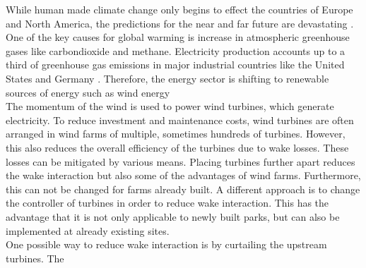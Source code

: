 While human made climate change only begins to effect the countries of Europe and North America, the predictions for the near and far future are devastating \cite{hoegh-guldberg_impacts_2019}. One of the key causes for global warming is increase in atmospheric greenhouse gases like carbondioxide and methane. Electricity production accounts  up to a third of greenhouse gas emissions in major industrial countries like the United States \cite{hockstad_inventory_2018} and Germany \cite{ortl_entwicklung_2020}. Therefore, the energy sector is shifting to renewable sources of energy such as wind energy \cite{international_energy_agency_global_2020}\\
The momentum of the wind is used to power wind turbines, which generate electricity. To reduce investment and maintenance costs, wind turbines are often arranged in wind farms of multiple, sometimes hundreds of turbines. However, this also reduces the overall efficiency of the turbines due to wake losses. These losses can be mitigated by various means. Placing turbines further apart reduces the wake interaction but also some of the advantages of wind farms. Furthermore, this can not be changed for farms already built. A different approach is to change the controller of turbines in order to reduce wake interaction. This has the advantage that it is not only applicable to newly built parks, but can also be implemented at already existing sites. \\
One possible way to reduce wake interaction is by curtailing the upstream turbines. The 